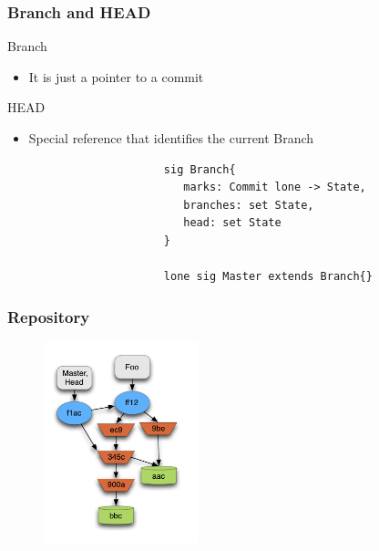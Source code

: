 \documentclass{beamer}
\begin{document}
\begin{frame}[fragile]
\frametitle{Branch and HEAD}
   \begin{block}{Branch}
      \begin{itemize}
         \item It is just a pointer to a commit
      \end{itemize}
   \end{block}
   \begin{block}{HEAD}
      \begin{itemize} 
         \item Special reference that identifies the current Branch
      \end{itemize}
   \end{block}
   \tiny
   \color{blue}
   \begin{lstlisting}
                        sig Branch{
                           marks: Commit lone -> State,
                           branches: set State,
                           head: set State
                        }

                        lone sig Master extends Branch{}
   \end{lstlisting}
\end{frame}

\begin{frame}
	\frametitle{Repository}
	\begin{figure}
		\centering
		\includegraphics[width=0.4\textwidth]{images/object_assoc.png}
	\end{figure}
\end{frame}
\end{document}
